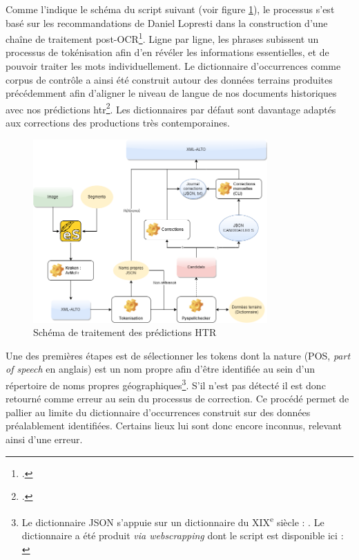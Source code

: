     Comme l'indique le schéma du script suivant (voir figure \ref{fig:postprocess}), le processus s'est basé sur les recommandations de Daniel Lopresti dans la construction d'une chaîne de traitement post-OCR\footcite{loprestiOpticalCharacterRecognition2009}. Ligne par ligne, les phrases subissent un processus de tokénisation afin d'en révéler les informations essentielles, et de pouvoir traiter les mots individuellement. Le dictionnaire d'occurrences comme corpus de contrôle a ainsi été construit autour des données terrains produites précédemment afin d'aligner le niveau de langue de nos documents historiques avec nos prédictions \gls{htr}\footcite{humeauPostprocessHTR2022}. Les dictionnaires par défaut sont davantage adaptés aux corrections des productions très contemporaines.
	
	\begin{figure}[h!]
	    \centering
	    \includegraphics[width=0.8\textwidth]{annexes/schema/post_traitement.png}
	    \caption{Schéma de traitement des prédictions HTR}
	    \label{fig:postprocess}
	\end{figure}
	
	Une des premières étapes est de sélectionner les tokens dont la nature (POS, \textit{part of speech} en anglais) est un nom propre afin d'être identifiée au sein d'un répertoire de noms propres géographiques\footnote{Le dictionnaire JSON s'appuie sur un dictionnaire du XIX\textsuperscript{e} siècle : \cite{solanoasta-buruagaDiccionarioGeograficoRepublica1899}. Le dictionnaire a été produit \textit{via webscrapping} dont le script est disponible ici : \cite{humeauEnrichmentWikisource2022}}. S'il n'est pas détecté il est donc retourné comme erreur au sein du processus de correction. Ce procédé permet de pallier au limite du dictionnaire d'occurrences construit sur des données préalablement identifiées. Certains lieux lui sont donc encore inconnus, relevant ainsi d'une erreur.
    
